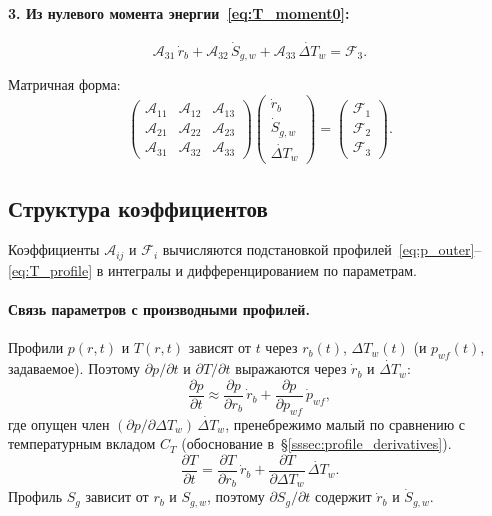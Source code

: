 \documentclass[12pt,a4paper]{article}
\newcommand{\pp}{\partial}
\begin{document}
\paragraph{3. Из нулевого момента энергии~\eqref{eq:T_moment0}:}
\begin{equation}\label{eq:ode3}
  \mathcal{A}_{31}\,\dot{r}_b
  + \mathcal{A}_{32}\,\dot{S}_{g,w}
  + \mathcal{A}_{33}\,\dot{\Delta T}_w
  = \mathcal{F}_3.
\end{equation}

Матричная форма:
\begin{equation}\label{eq:ode_system}
  \boxed{
    \begin{pmatrix}
      \mathcal{A}_{11} & \mathcal{A}_{12} & \mathcal{A}_{13} \\
      \mathcal{A}_{21} & \mathcal{A}_{22} & \mathcal{A}_{23} \\
      \mathcal{A}_{31} & \mathcal{A}_{32} & \mathcal{A}_{33}
    \end{pmatrix}
    \begin{pmatrix}
      \dot{r}_b \\ \dot{S}_{g,w} \\ \dot{\Delta T}_w
    \end{pmatrix}
    =
    \begin{pmatrix}
      \mathcal{F}_1 \\ \mathcal{F}_2 \\ \mathcal{F}_3
    \end{pmatrix}.
  }
\end{equation}

\subsection{Структура коэффициентов}

Коэффициенты $\mathcal{A}_{ij}$ и $\mathcal{F}_i$ вычисляются
подстановкой профилей~\eqref{eq:p_outer}--\eqref{eq:T_profile}
в интегралы и дифференцированием по параметрам.

\paragraph{Связь параметров с производными профилей.}
Профили $p(r,t)$ и $T(r,t)$ зависят от $t$ через
$r_b(t)$, $\Delta T_w(t)$ (и $p_{wf}(t)$, задаваемое).
Поэтому $\pp p/\pp t$ и $\pp T/\pp t$ выражаются
через $\dot{r}_b$ и $\dot{\Delta T}_w$:
\begin{equation}\label{eq:dp_dt}
  \frac{\pp p}{\pp t}
  \approx \frac{\pp p}{\pp r_b}\,\dot{r}_b
    + \frac{\pp p}{\pp p_{wf}}\,\dot{p}_{wf},
\end{equation}
где опущен член
$(\pp p/\pp\Delta T_w)\,\dot{\Delta T}_w$,
пренебрежимо малый по сравнению с температурным
вкладом $C_T$ (обоснование в~\S\ref{sssec:profile_derivatives}).
\begin{equation}\label{eq:dT_dt}
  \frac{\pp T}{\pp t}
  = \frac{\pp T}{\pp r_b}\,\dot{r}_b
    + \frac{\pp T}{\pp \Delta T_w}\,\dot{\Delta T}_w.
\end{equation}
Профиль $S_g$ зависит от $r_b$ и $S_{g,w}$, поэтому
$\pp S_g/\pp t$ содержит $\dot{r}_b$ и $\dot{S}_{g,w}$.
\end{document}
